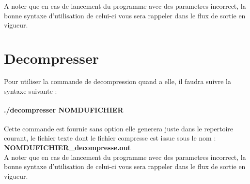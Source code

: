 \documentclass[frenchb]{article}
\begin{document}
A noter que en cas de lancement du programme avec des parametres incorrect, la bonne syntaxe d'utilisation de celui-ci vous sera rappeler dans le flux de sortie en vigueur.
  \

\section{Decompresser}
Pour utiliser la commande de decompression quand a elle, il faudra suivre la syntaxe suivante : \\\\ \textbf{./decompresser NOMDUFICHIER}\\\\
Cette commande est fournie sans option elle generera juste dans le repertoire courant, le fichier texte dont le fichier compresse est issue
sous le nom : \textbf{NOMDUFICHIER\_decompresse.out}\\

A noter que en cas de lancement du programme avec des parametres incorrect, la bonne syntaxe d'utilisation de celui-ci vous sera rappeler dans le flux de sortie en vigueur.
	
\end{document}
